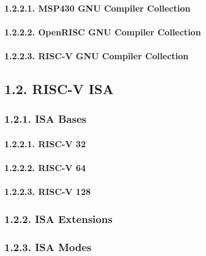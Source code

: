\documentclass[]{article}
\let\oldparagraph\paragraph
\renewcommand{\paragraph}[1]{\oldparagraph{#1}\mbox{}}
\begin{document}
\paragraph{1.2.2.1. MSP430 GNU Compiler
Collection}\label{msp430-gnu-compiler-collection}

\paragraph{1.2.2.2. OpenRISC GNU Compiler
Collection}\label{openrisc-gnu-compiler-collection}

\paragraph{1.2.2.3. RISC-V GNU Compiler
Collection}\label{risc-v-gnu-compiler-collection}

\subsection{1.2. RISC-V ISA}\label{risc-v-isa}

\subsubsection{1.2.1. ISA Bases}\label{isa-bases}

\paragraph{1.2.2.1. RISC-V 32}\label{risc-v-32}

\paragraph{1.2.2.2. RISC-V 64}\label{risc-v-64}

\paragraph{1.2.2.3. RISC-V 128}\label{risc-v-128}

\subsubsection{1.2.2. ISA Extensions}\label{isa-extensions}

\subsubsection{1.2.3. ISA Modes}\label{isa-modes}
\end{document}

